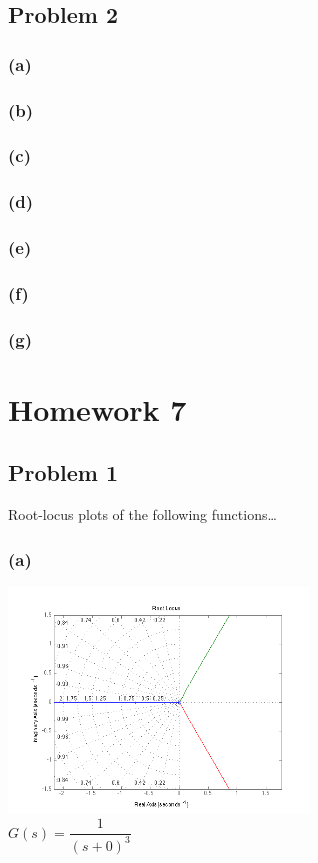 \documentclass[letterpaper,10pt]{article}
\begin{document}
\subsection*{Problem 2}
\subsubsection*{(a)}
\subsubsection*{(b)}
\subsubsection*{(c)}
\subsubsection*{(d)}
\subsubsection*{(e)}
\subsubsection*{(f)}
\subsubsection*{(g)}

\section*{Homework 7}
\subsection*{Problem 1}
Root-locus plots of the following functions\dots
\subsubsection*{(a)}
\begin{center}
    \includegraphics[width=0.6\textwidth]{homework04-7-1-a.png} \\
   $G(s) = \dfrac{1}{(s+0)^{3}}$
\end{center}
\end{document}
